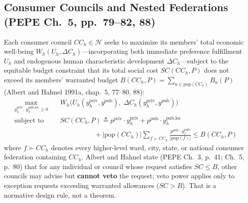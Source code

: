\documentclass[10pt,twoside,openany]{book}
\theoremstyle{dpepstyle}
\begin{document}
\subsection{Consumer Councils and Nested Federations (PEPE Ch.~5, pp.~79--82, 88)}
Each consumer council $CC_h \in \mathcal{H}$ seeks to maximize its members' total economic well-being $W_h(U_h, \Delta C_h)$---incorporating both immediate preference fulfillment $U_h$ and endogenous human characteristic development $\Delta C_h$---subject to the equitable budget constraint that its total social cost $SC(CC_h, P)$ does not exceed its members' warranted budget $B(CC_h, P) = \sum_{u \in \text{pop}(CC_h)} B_u(P)$ (Albert and Hahnel 1991a, chap.~5, 77--80, 88):
\begin{align}
  \max_{y_h^{\text{priv}}, \, y_h^{\text{pub,loc}} \ge 0} \quad & W_h\Big(U_h(y_h^{\text{priv}}, y^{\text{pub}}), \; \Delta C_h(y_h^{\text{priv}}, y^{\text{pub}})\Big) \\
  \text{subject to} \quad & SC(CC_h, P) \triangleq p^{\text{priv}} \cdot y_h^{\text{priv}} + p^{\text{pub}} \cdot y_h^{\text{pub,loc}} \nonumber \\
  &\qquad\qquad\quad + |\text{pop}(CC_h)| \sum_{f \succ CC_h} \frac{p^{\text{pub}} \cdot y_f^{\text{pub}}}{|\text{pop}(f)|} \le B(CC_h, P) \nonumber
\end{align}
where $f \succ CC_h$ denotes every higher-level ward, city, state, or national consumer federation containing $CC_h$. Albert and Hahnel state (PEPE Ch.~3, p.~41; Ch.~5, p.~80) that for any individual or council whose request satisfies $SC \le B$, other councils may advise but \textbf{cannot veto} the request; veto power applies only to exception requests exceeding warranted allowances ($SC > B$). That is a normative design rule, not a theorem.
\end{document}
